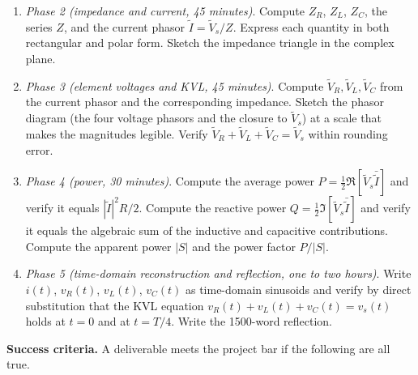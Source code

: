 \begin{project}
\begin{enumerate}[leftmargin=*]
  \item \emph{Phase 2 (impedance and current, 45 minutes)}. Compute
    $Z_{R}$, $Z_{L}$, $Z_{C}$, the series $Z$, and the current
    phasor $\tilde I = \tilde V_{s} / Z$. Express each quantity in
    both rectangular and polar form. Sketch the impedance triangle
    in the complex plane.

  \item \emph{Phase 3 (element voltages and KVL, 45 minutes)}.
    Compute $\tilde V_{R}, \tilde V_{L}, \tilde V_{C}$ from the
    current phasor and the corresponding impedance. Sketch the
    phasor diagram (the four voltage phasors and the closure to
    $\tilde V_{s}$) at a scale that makes the magnitudes legible.
    Verify $\tilde V_{R} + \tilde V_{L} + \tilde V_{C} = \tilde V_{s}$
    within rounding error.

  \item \emph{Phase 4 (power, 30 minutes)}. Compute the average
    power $P = \tfrac{1}{2}\Re[\tilde V_{s} \bar{\tilde I}]$ and
    verify it equals $|\tilde I|^{2} R / 2$. Compute the reactive
    power $Q = \tfrac{1}{2}\Im[\tilde V_{s} \bar{\tilde I}]$ and
    verify it equals the algebraic sum of the inductive and
    capacitive contributions. Compute the apparent power $|S|$ and
    the power factor $P / |S|$.

  \item \emph{Phase 5 (time-domain reconstruction and reflection,
    one to two hours)}. Write $i(t)$, $v_{R}(t)$, $v_{L}(t)$,
    $v_{C}(t)$ as time-domain sinusoids and verify by direct
    substitution that the KVL equation $v_{R}(t) + v_{L}(t) +
    v_{C}(t) = v_{s}(t)$ holds at $t = 0$ and at $t = T/4$. Write
    the 1500-word reflection.
\end{enumerate}

\textbf{Success criteria.} A deliverable meets the project bar if
the following are all true.


\end{project}
